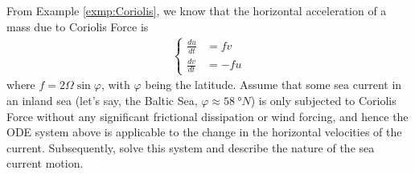 \begin{exmp}
From Example \ref{exmp:Coriolis}, we know that the horizontal acceleration of a mass due to Coriolis Force is
\begin{align}
\left\{\begin{alignedat}{2}
\frac{du}{dt} &= fv \\
\frac{dv}{dt} &= -fu
\end{alignedat}\right.
\end{align}
where $f = 2\Omega \sin\varphi$, with $\varphi$ being the latitude. Assume that some sea current in an inland sea (let's say, the Baltic Sea, $\varphi \approx \SI{58}{\degree N}$) is only subjected to Coriolis Force without any significant frictional dissipation or wind forcing, and hence the ODE system above is applicable to the change in the horizontal velocities of the current. Subsequently, solve this system and describe the nature of the sea current motion.
\end{exmp}
